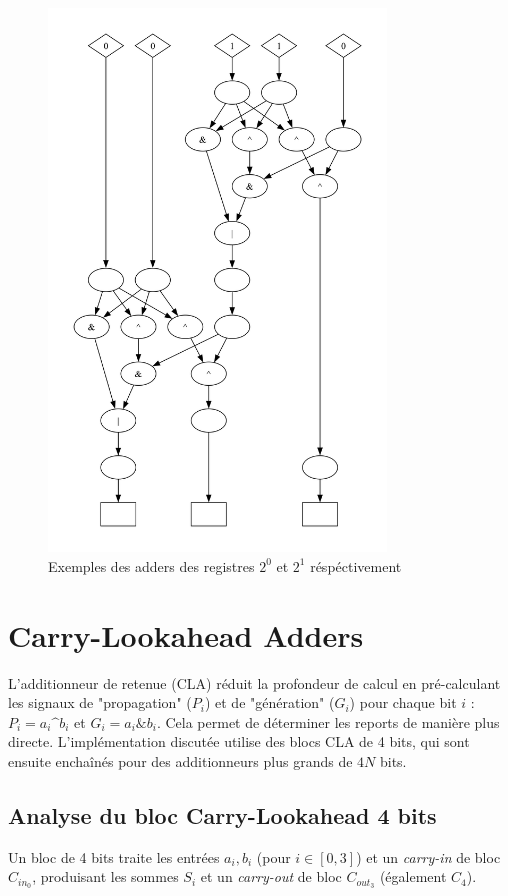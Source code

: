 \begin{figure}[H]
\begin{minipage}{0.49\textwidth}
        \includegraphics[width=0.8\textwidth]{figures/adder_3_bit.png}
    \end{minipage}
    \caption{Exemples des adders des registres $2^0$ et  $2^1$ réspéctivement}
    \label{fig:}
\end{figure}

\section{Carry-Lookahead Adders}

L'additionneur de retenue (CLA) réduit la profondeur de calcul en pré-calculant les signaux de "propagation" ($P_i$) et de "génération" ($G_i$) pour chaque bit $i$ : $P_i = a_i \text{\textasciicircum} b_i$ et $G_i = a_i \& b_i$. Cela permet de déterminer les reports de manière plus directe. L'implémentation discutée utilise des blocs CLA de 4 bits, qui sont ensuite enchaînés pour des additionneurs plus grands de $4N$ bits.
\subsection{Analyse du bloc Carry-Lookahead 4 bits}
Un bloc de 4 bits traite les entrées $a_i, b_i$ (pour $i \in [0,3]$) et un \textit{carry-in} de bloc $C_{in_0}$, produisant les sommes $S_i$ et un \textit{carry-out} de bloc $C_{out_3}$ (également $C_4$).

